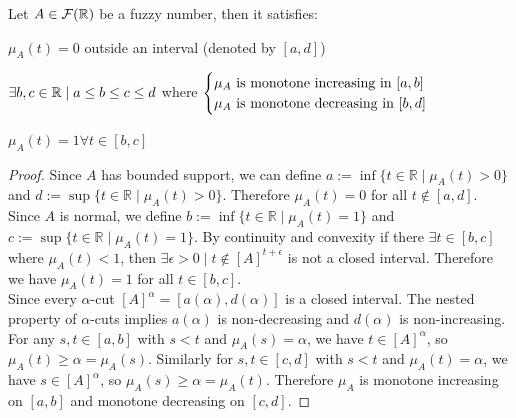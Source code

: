 \begin{proposition}
    Let $A\in \mathcal{F}(\mathbb{R})$ be a fuzzy number, then it satisfies:
    \begin{romanenum}
        \item $\mu_A(t)=0$ outside an interval (denoted by $[a,d]$)\vspace{-0.5em}
        \item $\exists b,c \in \mathbb{R} \mid a\leq b \leq c \leq d$ where $\begin{cases}
            \mu_A\textnormal{ is monotone increasing in }[a,b]\\
            \mu_A\textnormal{ is monotone decreasing in }[b,d]\\
        \end{cases}$\vspace{-0.5em}
        \item $\mu_A(t)=1 \forall t\in [b,c]$
    \end{romanenum}
\end{proposition}


\begin{proof}
 Since $A$ has bounded support, we can define $a:=\inf\{t\in\mathbb{R} \mid \mu_A(t)>0\}$ and $d:=\sup\{t\in\mathbb{R} \mid \mu_A(t)>0\}$. Therefore $\mu_A(t)=0$ for all $t\notin[a,d]$. \\

 Since $A$ is normal, we define $b:=\inf\{t\in\mathbb{R} \mid \mu_A(t)=1\}$ and $c:=\sup\{t\in\mathbb{R} \mid \mu_A(t)=1\}$. By continuity and convexity if there $\exists t\in [b,c]$ where $\mu_A(t)<1$, then $\exists \epsilon >0 \mid t\notin [A]^{t+\epsilon}$ is not a closed interval. Therefore we have $\mu_A(t)=1$ for all $t\in[b,c]$. \\

 Since every $\alpha$-cut $[A]^\alpha=[a(\alpha),d(\alpha)]$ is a closed interval. The nested property of $\alpha$-cuts implies $a(\alpha)$ is non-decreasing and $d(\alpha)$ is non-increasing. For any $s,t\in[a,b]$ with $s<t$ and $\mu_A(s)=\alpha$, we have $t\in[A]^\alpha$, so $\mu_A(t)\geq\alpha=\mu_A(s)$. Similarly for $s,t\in[c,d]$ with $s<t$ and $\mu_A(t)=\alpha$, we have $s\in[A]^\alpha$, so $\mu_A(s)\geq\alpha=\mu_A(t)$. Therefore $\mu_A$ is monotone increasing on $[a,b]$ and monotone decreasing on $[c,d]$.
\end{proof}


